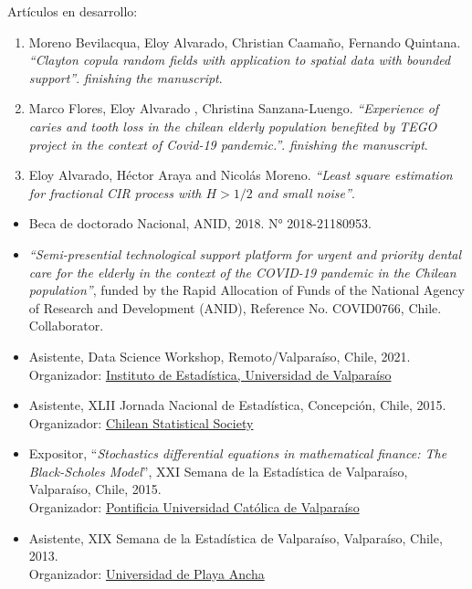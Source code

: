 \documentclass[10pt,a4paper]{article}
\begin{document}
\headedsubsection 
{Artículos en desarrollo:}{}
{\begin{enumerate}
\item Moreno Bevilacqua, Eloy Alvarado, Christian Caamaño, Fernando Quintana. \textit{``Clayton copula random fields with application to spatial data with bounded support''}. \textit{finishing the manuscript}.
\item Marco Flores, Eloy Alvarado , Christina Sanzana-Luengo. \textit{``Experience of caries and tooth loss in the chilean elderly population benefited by TEGO project in the context of Covid-19 pandemic.''}. \textit{finishing the manuscript}.
\item Eloy Alvarado, Héctor Araya and Nicolás Moreno. \textit{``Least square estimation for fractional CIR process with $H>1/2$ and small noise''}.
\end{enumerate}
}

\begin{itemize}
\item Beca de doctorado Nacional, ANID, 2018. N° 2018-21180953.
\item \textit{``Semi-presential technological support platform for urgent and
priority dental care for the elderly in the context of the COVID-19 pandemic in the Chilean population''}, funded by the Rapid Allocation of Funds of the National Agency of Research and
Development (ANID), Reference No. COVID0766, Chile. Collaborator.
\end{itemize}




\begin{itemize}
\item Asistente, Data Science Workshop, Remoto/Valparaíso, Chile, 2021.\\
Organizador: \href{https://ideuv.uv.cl/}{Instituto de Estadística, Universidad de Valparaíso}

\item Asistente, XLII Jornada Nacional de Estadística, Concepción, Chile, 2015. \\
Organizador:  \href{http://www.soche.cl}{ Chilean Statistical
Society}
\item Expositor, ``\textit{Stochastics differential equations in mathematical finance: The Black-Scholes Model}'', XXI Semana de la Estadística de Valparaíso, Valparaíso, Chile, 2015. \\ Organizador: \href{http://www.pucv.cl}{Pontificia Universidad Católica de Valparaíso}

\item Asistente, XIX Semana de la Estadística de Valparaíso, Valparaíso, Chile, 2013. \\ Organizador:  \href{http://www.upla.cl}{Universidad de Playa Ancha}


\end{itemize}
\end{document}

